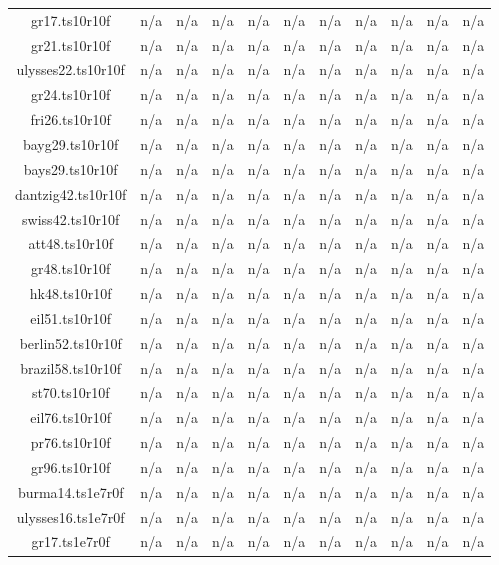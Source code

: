 \begin{table}[htbp]
\begin{tabular}{|ccccccccccc|}
gr17.ts10r10f & n/a & n/a & n/a & n/a & n/a & n/a & n/a & n/a & n/a & n/a \\
gr21.ts10r10f & n/a & n/a & n/a & n/a & n/a & n/a & n/a & n/a & n/a & n/a \\
ulysses22.ts10r10f & n/a & n/a & n/a & n/a & n/a & n/a & n/a & n/a & n/a & n/a \\
gr24.ts10r10f & n/a & n/a & n/a & n/a & n/a & n/a & n/a & n/a & n/a & n/a \\
fri26.ts10r10f & n/a & n/a & n/a & n/a & n/a & n/a & n/a & n/a & n/a & n/a \\
bayg29.ts10r10f & n/a & n/a & n/a & n/a & n/a & n/a & n/a & n/a & n/a & n/a \\
bays29.ts10r10f & n/a & n/a & n/a & n/a & n/a & n/a & n/a & n/a & n/a & n/a \\
dantzig42.ts10r10f & n/a & n/a & n/a & n/a & n/a & n/a & n/a & n/a & n/a & n/a \\
swiss42.ts10r10f & n/a & n/a & n/a & n/a & n/a & n/a & n/a & n/a & n/a & n/a \\
att48.ts10r10f & n/a & n/a & n/a & n/a & n/a & n/a & n/a & n/a & n/a & n/a \\
gr48.ts10r10f & n/a & n/a & n/a & n/a & n/a & n/a & n/a & n/a & n/a & n/a \\
hk48.ts10r10f & n/a & n/a & n/a & n/a & n/a & n/a & n/a & n/a & n/a & n/a \\
eil51.ts10r10f & n/a & n/a & n/a & n/a & n/a & n/a & n/a & n/a & n/a & n/a \\
berlin52.ts10r10f & n/a & n/a & n/a & n/a & n/a & n/a & n/a & n/a & n/a & n/a \\
brazil58.ts10r10f & n/a & n/a & n/a & n/a & n/a & n/a & n/a & n/a & n/a & n/a \\
st70.ts10r10f & n/a & n/a & n/a & n/a & n/a & n/a & n/a & n/a & n/a & n/a \\
eil76.ts10r10f & n/a & n/a & n/a & n/a & n/a & n/a & n/a & n/a & n/a & n/a \\
pr76.ts10r10f & n/a & n/a & n/a & n/a & n/a & n/a & n/a & n/a & n/a & n/a \\
gr96.ts10r10f & n/a & n/a & n/a & n/a & n/a & n/a & n/a & n/a & n/a & n/a \\
burma14.ts1e7r0f & n/a & n/a & n/a & n/a & n/a & n/a & n/a & n/a & n/a & n/a \\
ulysses16.ts1e7r0f & n/a & n/a & n/a & n/a & n/a & n/a & n/a & n/a & n/a & n/a \\
gr17.ts1e7r0f & n/a & n/a & n/a & n/a & n/a & n/a & n/a & n/a & n/a & n/a \\

\end{tabular}
\end{table}
